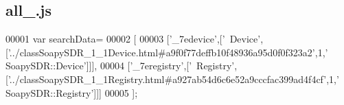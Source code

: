 \subsection{all\+\_.\+js}
\label{all__14_8js_source}

\begin{DoxyCode}
00001 var searchData=
00002 [
00003   [\textcolor{stringliteral}{'\_7edevice'},[\textcolor{stringliteral}{'~Device'},[\textcolor{stringliteral}{'../classSoapySDR\_1\_1Device.html#a9f0f77deffb10f48936a95d0f0f323a2'},1,\textcolor{stringliteral}{'
      SoapySDR::Device'}]]],
00004   [\textcolor{stringliteral}{'\_7eregistry'},[\textcolor{stringliteral}{'~Registry'},[\textcolor{stringliteral}{'../classSoapySDR\_1\_1Registry.html#a927ab54d6c6e52a9cccfac399ad4f4cf'},1,\textcolor{stringliteral}{'
      SoapySDR::Registry'}]]]
00005 ];
\end{DoxyCode}
